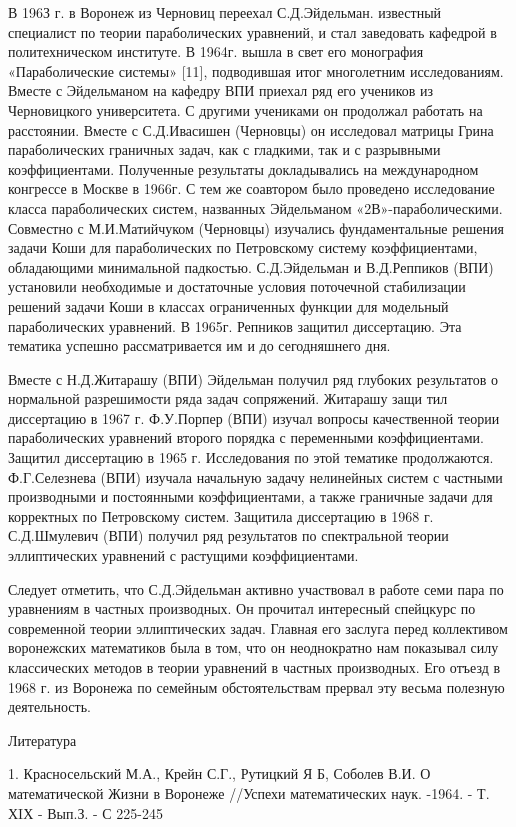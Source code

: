 В 196З г. в Воронеж из Черновиц переехал С.Д.Эйдельман. известный
специалист по теории параболических уравнений, и стал заведовать
кафедрой в политехническом институте. В 1964г. вышла в свет его монография «Параболические системы» [11], подводившая итог многолетним исследованиям. Вместе с Эйдельманом на кафедру ВПИ приехал ряд его учеников из Черновицкого университета. С другими учениками он продолжал работать на расстоянии. Вместе с С.Д.Ивасишен (Черновцы) он исследовал матрицы Грина параболических граничных задач, как с гладкими, так и с разрывными коэффициентами. Полученные результаты докладывались на международном конгрессе в Москве в 1966г. С тем же соавтором было проведено исследование класса параболических систем, названных Эйдельманом «2В»-параболическими. Совместно с М.И.Матийчуком (Черновцы) изучались фундаментальные
решения задачи Коши для параболических по Петровскому систему коэффициентами, обладающими минимальной падкостью. С.Д.Эйдельман и
В.Д.Реппиков (ВПИ) установили необходимые и достаточные условия поточечной стабилизации решений задачи Коши в классах ограниченных функции для
модельный параболических уравнений. В 1965г. Репников защитил диссертацию. Эта тематика успешно рассматривается им и до сегодняшнего дня.

Вместе с Н.Д.Житарашу (ВПИ) Эйдельман получил ряд глубоких результатов о нормальной разрешимости ряда задач сопряжений. Житарашу защи тил диссертацию в 1967 г. Ф.У.Порпер (ВПИ) изучал вопросы качественной теории параболических уравнений второго порядка с переменными коэффициентами. Защитил диссертацию в 1965 г. Исследования по этой тематике продолжаются. Ф.Г.Селезнева (ВПИ) изучала начальную задачу нелинейных систем с частными производными и постоянными коэффициентами, а также граничные задачи для корректных по Петровскому систем. Защитила диссертацию в 1968 г. С.Д.Шмулевич (ВПИ) получил ряд результатов по спектральной теории эллиптических уравнений с растущими коэффициентами.

Следует отметить, что С.Д.Эйдельман активно участвовал в работе семи пара по уравнениям в частных производных. Он прочитал интересный спейцкурс по современной теории эллиптических задач. Главная его заслуга перед коллективом воронежских математиков была в том, что он неоднократно нам показывал силу классических методов в теории уравнений в частных производных. Его отъезд в 1968 г. из Воронежа по семейным обстоятельствам прервал эту весьма полезную деятельность.

Литература

1.	Красносельский М.А., Крейн С.Г., Рутицкий Я Б, Соболев В.И. О математической Жизни в Воронеже //Успехи математических наук. -1964. - Т. ХIХ - Вып.З. - С 225-245

